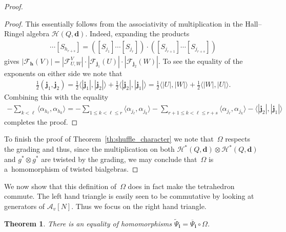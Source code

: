 \documentclass[pdftex]{sigma}
\numberwithin{equation}{section}
\newtheorem{Theorem}{Theorem}[section]
\begin{document}
\begin{proof}
\begin{proof}
This essentially follows from the associativity of multiplication in the Hall--Ringel algebra
$\mathcal{H}(Q,\mathbf{d})$.
Indeed, expanding the products
\begin{gather*}
[S_{h_1}]\cdots[S_{h_{r+s}}]=([S_{j_1}]\cdots[S_{j_r}])\cdot([S_{j_{r+1}}]\cdots[S_{j_{r+s}}])
\end{gather*}
gives
$|\mathcal{F}_\mathbf{h}(V)|=|\mathcal{F}_{U,W}^V|\cdot|\mathcal{F}_{\mathbf{j}_1}(U)|\cdot|\mathcal{F}_{\mathbf{j}_2}(W)|$.
To see the equality of the exponents on either side we note that
\begin{gather*}
\frac{1}{2}(\mathbf{j}_1,\mathbf{j}_2)
=\frac{1}{2}\langle|\mathbf{j}_1|,|\mathbf{j}_2|\rangle+\frac{1}{2}\langle|\mathbf{j}_2|,|\mathbf{j}_1|\rangle
=\frac{1}{2}\langle|U|,|W|\rangle+\frac{1}{2}\langle|W|,|U|\rangle.
\end{gather*}
Combining this with the equality
\begin{gather*}
-\sum\limits_{k<\ell}\langle \alpha_{h_\ell},\alpha_{h_k}\rangle=-\sum\limits_{1\le k<\ell\le r}\langle
\alpha_{j_\ell},\alpha_{j_k}\rangle-\sum\limits_{r+1\le k<\ell\le r+s}\langle
\alpha_{j_\ell},\alpha_{j_k}\rangle-\langle|\mathbf{j}_2|,|\mathbf{j}_1|\rangle
\end{gather*}
completes the proof.
\end{proof}

To f\/inish the proof of Theorem~\ref{th:shuffle_character} we note that~$\Omega$ respects the grading and thus, since the
multiplication on both $\mathcal{H}^*(Q,\mathbf{d})\otimes\mathcal{H}^*(Q,\mathbf{d})$ and $g^*\otimes g^*$ are twisted
by the grading, we may conclude that~$\Omega$ is a~homomorphism of twisted bialgebras.
\end{proof}

We now show that this def\/inition of~$\Omega$ does in fact make the tetrahedron commute.
The left hand triangle is easily seen to be commutative by looking at generators of $\mathcal{A}_v[N]$.
Thus we focus on the right hand triangle.

\begin{Theorem}
\label{th:psi factorization}
There is an equality of homomorphisms $\widetilde\Psi_\mathbf{i}=\overline\Psi_\mathbf{i}\circ\Omega$.
\end{Theorem}
\end{document}
